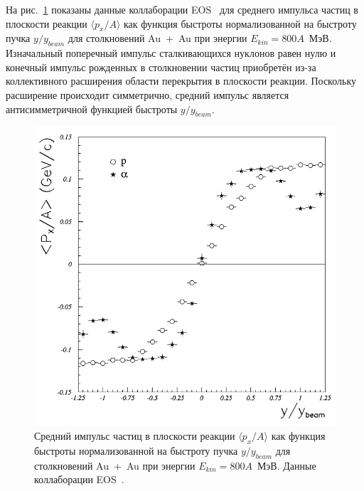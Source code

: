 На рис.~\ref{fig:eos_px_y} показаны данные коллаборации EOS~\cite{EOS:1994kku} для среднего импульса частиц в плоскости реакции $\langle p_x /A \rangle$ как функция быстроты нормализованной на быстроту пучка $y/y_{beam}$ для столкновений Au~+~Au при энергии $E_{kin}=800A$~МэВ.
Изначальный поперечный импульс сталкивающихся нуклонов равен нулю и конечный импульс рожденных в столкновении частиц приобретён из-за коллективного расширения области перекрытия в плоскости реакции.
Поскольку расширение происходит симметрично, средний импульс является антисимметричной функцией быстроты $y/y_{beam}$.
%
\begin{figure}
    \centering
    \includegraphics[width=0.55\linewidth]{images/eos_px_y.png}
    \caption{Средний импульс частиц в плоскости реакции $\langle p_x /A \rangle$ как функция быстроты нормализованной на быстроту пучка $y/y_{beam}$ для столкновений Au~+~Au при энергии $E_{kin}=800A$~МэВ. Данные коллаборации EOS~\cite{EOS:1994kku}.}
    \label{fig:eos_px_y}
\end{figure}

